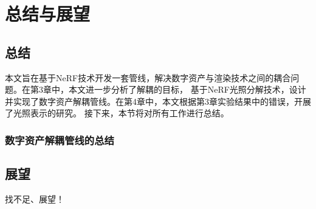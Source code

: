 
\chapter{总结与展望}

\section{总结}

本文旨在基于NeRF技术开发一套管线，解决数字资产与渲染技术之间的耦合问题。在第3章中，本文进一步分析了解耦的目标，
基于NeRF光照分解技术，设计并实现了数字资产解耦管线。在第4章中，本文根据第3章实验结果中的错误，开展了光照表示的研究。
接下来，本节将对所有工作进行总结。

\subsection{数字资产解耦管线的总结}

\section{展望}

找不足、展望！
